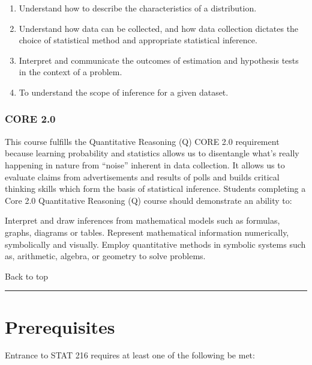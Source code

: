 \documentclass[
]{article}
\providecommand{\tightlist}{%
  \setlength{\itemsep}{0pt}\setlength{\parskip}{0pt}}
\begin{document}
\begin{enumerate}
\def\labelenumi{\arabic{enumi}.}
\tightlist
\item
  Understand how to describe the characteristics of a distribution.
\item
  Understand how data can be collected, and how data collection dictates
  the choice of statistical method and appropriate statistical
  inference.
\item
  Interpret and communicate the outcomes of estimation and hypothesis
  tests in the context of a problem.
\item
  To understand the scope of inference for a given dataset.
\end{enumerate}

\subsubsection{CORE 2.0}\label{core-2.0}

This course fulfills the Quantitative Reasoning (Q) CORE 2.0 requirement
because learning probability and statistics allows us to disentangle
what's really happening in nature from ``noise'' inherent in data
collection. It allows us to evaluate claims from advertisements and
results of polls and builds critical thinking skills which form the
basis of statistical inference. Students completing a Core 2.0
Quantitative Reasoning (Q) course should demonstrate an ability to:

Interpret and draw inferences from mathematical models such as formulas,
graphs, diagrams or tables. Represent mathematical information
numerically, symbolically and visually. Employ quantitative methods in
symbolic systems such as, arithmetic, algebra, or geometry to solve
problems.

Back to top

\begin{center}\rule{0.5\linewidth}{0.5pt}\end{center}

\section{Prerequisites}\label{prerequisites}

Entrance to STAT 216 requires at least one of the following be met:
\end{document}
